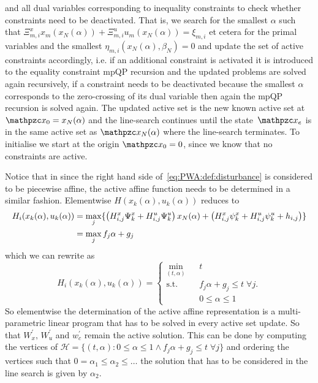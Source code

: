 \documentclass{ifacconf}
\newcommand*{\Resize}[1]{\resizebox{\columnwidth}{!}{$#1$}}
\begin{document}
and all dual variables corresponding to inequality constraints to check whether constraints need to be deactivated. That is,
we search for the smallest $\alpha$ such that $\Xi_{m,i}^x x_m(x_N(\alpha))+\Xi_{m,i}^u u_m(x_N(\alpha))=\xi_{m,i}$
et cetera for the primal variables and the smallest $\eta_{m,i}(x_N(\alpha),\beta_N)=0$ and update the set of active
constraints accordingly, i.e. if an additional constraint is activated it is introduced to the equality constraint
mpQP recursion and the updated problems are solved again recursively, if a constraint needs to be deactivated
because the smallest $\alpha$ corresponds to the zero-crossing of its dual variable then again the mpQP recursion 
is solved again. The updated active set is the new known active set at $\mathpzc x_0 = x_N(\alpha)$ and the line-search
continues until the state~$\mathpzc x_e$ is in the same active set as $\mathpzc x_N(\alpha)$ where the line-search terminates.
To initialise we start at the origin $\mathpzc x_0=0$, since we know that no constraints are active. 

Notice that in since the right hand side of~\eqref{eq:PWA:def:disturbance} is considered to be piecewise affine, the active 
affine function needs to be determined in a similar fashion. Elementwise $H(x_k(\alpha),u_k(\alpha))$ reduces to 
\begin{equation}
\Resize{
\begin{split}
	H_i(x_k(\alpha),u_k(\alpha)) &= \max_j\{\left(H^x_{i,j} \Psi^x_k +H^u_{i,j}\Psi^u_k\right)x_N(\alpha) + 
	\left(H^x_{i,j} \psi^x_k +H^u_{i,j}\psi^u_k + h_{i,j}\right) \}\\
	&=\max_j f_j\alpha + g_j
	\end{split}
}
\end{equation}
which we can rewrite as
\begin{equation}\label{eq:definition:as:mpLP}
	H_i(x_k(\alpha),u_k(\alpha)) = \left\{\begin{array}{rcl} \min_{(t,\alpha)}& &t\\
	\text{s.t.}& &f_j\alpha+g_j \leq t\; \forall j.\\
	& &0\leq\alpha\leq1
	\end{array}\right.
\end{equation}
So elementwise the determination of the active affine representation is a multi-parametric linear program
that has to be solved in every active set update. So that $W_x^\prime,\,W_u^\prime$ and $w^\prime_c$ remain the active
solution. This can be done by computing the vertices of $\mathcal H = \{(t,\alpha):0\leq\alpha\leq1\wedge
f_j\alpha+g_j\leq t\;\forall j\}$ and ordering the vertices such that $0=\alpha_1\leq\alpha_2\leq\dots$ the solution
that has to be considered in the line search is given by $\alpha_2$.
\end{document}

